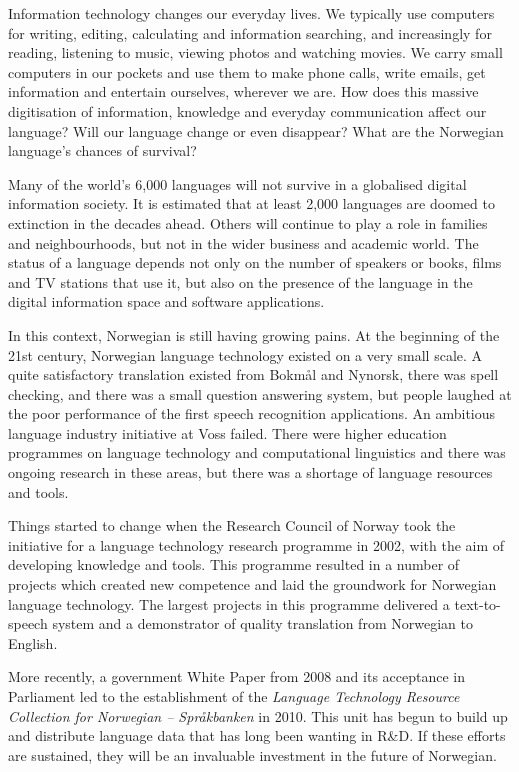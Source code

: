 
\begin{multicols}{2}
Information technology changes our everyday lives. We typically use computers for writing, editing, calculating and information searching, and increasingly for reading, listening to music, viewing photos and watching movies. We carry small computers in our pockets and use them to make phone calls, write emails, get information and entertain ourselves, wherever we are. How does this massive digitisation of information, knowledge and everyday communication affect our language? Will our language change or even disappear? What are the Norwegian language’s chances of survival?

Many of the world’s 6,000 languages will not survive in a globalised digital information society. It is estimated that at least 2,000 languages are doomed to extinction in the decades ahead. Others will continue to play a role in families and neighbourhoods, but not in the wider business and academic world. The status of a language depends not only on the number of speakers or books, films and TV stations that use it, but also on the presence of the language in the digital information space and software applications. 

In this context, Norwegian is still having growing pains. At the beginning of the 21st century, Norwegian language technology existed on a very small scale. A quite satisfactory translation existed from Bokmål and Nynorsk, there was spell checking, and there was a small question answering system, but people laughed at the poor performance of the first speech recognition applications. An ambitious language industry initiative at Voss failed. There were higher education programmes on language technology and computational linguistics and there was ongoing research in these areas, but there was a shortage of language resources and tools. 

Things started to change when the Research Council of Norway took the initiative for a language technology research programme in 2002, with the aim of developing knowledge and tools. This programme resulted in a number of projects which created new competence and laid the groundwork for Norwegian language technology. The largest projects in this programme delivered a text-to-speech system and a demonstrator of quality translation from Norwegian to English.

More recently, a government White Paper from 2008 \cite{stm35:2008} and its acceptance in Parliament led to the establishment of the \emph{Language Technology Resource Collection for Norwegian -- Språkbanken} in 2010. This unit has begun to build up and distribute language data that has long been wanting in R\&D. If these efforts are sustained, they will be an invaluable investment in the future of Norwegian.


\end{multicols}
